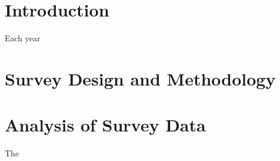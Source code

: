 \documentclass[12pt]{article}
\begin{document}
\maketitle




\section{Introduction}
Each year 

\section{Survey Design and Methodology}

\section{Analysis of Survey Data}
The 
\end{document}
